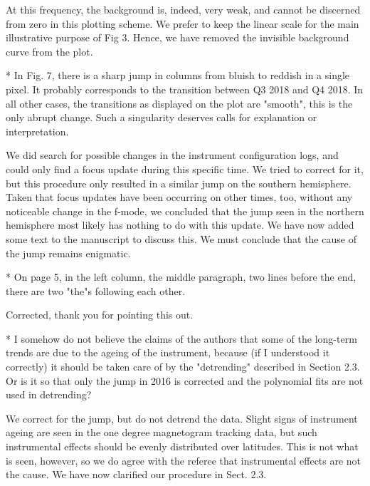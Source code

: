 \documentclass[12pt, letterpaper]{article}
\newcommand{\blue}{\color{blue}}
\begin{document}
\medskip \noindent At this frequency, the background is, indeed, very weak, and cannot be discerned from zero in this plotting scheme. We prefer to keep the linear scale for the main illustrative purpose of Fig 3. Hence, we have removed the invisible background curve from the plot.  \medskip

{\blue * In Fig. 7, there is a sharp jump in columns from bluish to reddish in a single pixel. It probably corresponds to the transition between Q3 2018 and Q4 2018. In all other cases, the transitions as displayed on the plot are "smooth", this is the only abrupt change. Such a singularity deserves calls for explanation or interpretation.}

\medskip \noindent We did search for possible changes in the instrument configuration logs, and could only find a focus update during this specific time. We tried to correct for it, but this procedure only resulted in a similar jump on the southern hemisphere. Taken that focus updates have been occurring on other times, too, without any noticeable change in the f-mode, we concluded that the jump seen in the northern hemisphere most likely has nothing to do with this update. We have now added some text to the manuscript to discuss this. We must conclude that the cause of the jump remains enigmatic. \medskip

{\blue * On page 5, in the left column, the middle paragraph, two lines before the end, there are two "the"s following each other.}

\medskip \noindent Corrected, thank you for pointing this out. \medskip

{\blue * I somehow do not believe the claims of the authors that some of the long-term trends are due to the ageing of the instrument, because (if I understood it correctly) it should be taken care of by the "detrending" described in Section 2.3. Or is it so that only the jump in 2016 is corrected and the polynomial fits are not used in detrending?}

\medskip \noindent We correct for the jump, but do not detrend the data. Slight signs of instrument ageing are seen in the one degree magnetogram tracking data, but such instrumental effects should be evenly distributed over latitudes. This is not what is seen, however, so we do agree with the referee that instrumental effects are not the cause. We have now clarified our procedure in Sect. 2.3.
\end{document}
